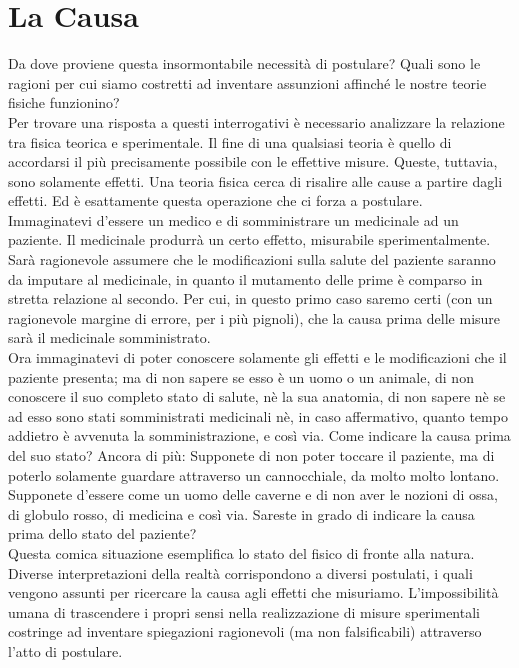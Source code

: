 \documentclass[]{scrbook}
\begin{document}
	\section{La Causa}
	Da dove proviene questa insormontabile necessità di postulare? Quali sono le ragioni per cui siamo costretti ad inventare assunzioni affinché le nostre teorie fisiche funzionino? \\
	Per trovare una risposta a questi interrogativi è necessario analizzare la relazione tra fisica teorica e sperimentale. Il fine di una qualsiasi teoria è quello di accordarsi il più precisamente possibile con le effettive misure. Queste, tuttavia, sono solamente effetti. Una teoria fisica cerca di risalire alle cause a partire dagli effetti. Ed è esattamente questa operazione che ci forza a postulare.\\
	Immaginatevi d'essere un medico e di somministrare un medicinale ad un paziente. Il medicinale produrrà un certo effetto, misurabile sperimentalmente. Sarà ragionevole assumere che le modificazioni sulla salute del paziente saranno da imputare al medicinale, in quanto il mutamento delle prime è comparso in stretta relazione al secondo. Per cui, in questo primo caso saremo certi (con un ragionevole margine di errore, per i più pignoli), che la causa prima delle misure sarà il medicinale somministrato.\\
	Ora immaginatevi di poter conoscere solamente gli effetti e le modificazioni che il paziente presenta; ma di non sapere se esso è un uomo o un animale, di non conoscere il suo completo stato di salute, nè la sua anatomia, di non sapere nè se ad esso sono stati somministrati medicinali nè, in caso affermativo, quanto tempo addietro è avvenuta la somministrazione, e così via. Come indicare la causa prima del suo stato? Ancora di più: Supponete di non poter toccare il paziente, ma di poterlo solamente guardare attraverso un cannocchiale, da molto molto lontano. Supponete d'essere come un uomo delle caverne e di non aver le nozioni di ossa, di globulo rosso, di medicina e così via.
	Sareste in grado di indicare la causa prima dello stato del paziente?\\
	Questa comica situazione esemplifica lo stato del fisico di fronte alla natura. Diverse interpretazioni della realtà corrispondono a diversi postulati, i quali vengono assunti per ricercare la causa agli effetti che misuriamo. L'impossibilità umana di trascendere i propri sensi nella realizzazione di misure sperimentali costringe ad inventare spiegazioni ragionevoli (ma non falsificabili) attraverso l'atto di postulare.
\end{document}
